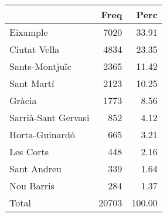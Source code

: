 
\begin{tabular}[t]{lrr}
\toprule
  & Freq & Perc\\
\midrule
Eixample & 7020 & 33.91\\
Ciutat Vella & 4834 & 23.35\\
Sants-Montjuïc & 2365 & 11.42\\
Sant Martí & 2123 & 10.25\\
Gràcia & 1773 & 8.56\\
\addlinespace
Sarrià-Sant Gervasi & 852 & 4.12\\
Horta-Guinardó & 665 & 3.21\\
Les Corts & 448 & 2.16\\
Sant Andreu & 339 & 1.64\\
Nou Barris & 284 & 1.37\\
\addlinespace
Total & 20703 & 100.00\\
\bottomrule
\end{tabular}